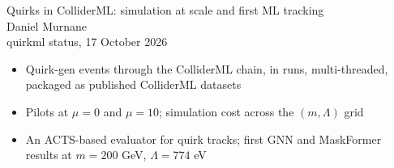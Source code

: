 \documentclass[aspectratio=169,10pt]{beamer}
\begin{document}
\begin{frame}
\vspace{2em}
{\Large Quirks in ColliderML: simulation at scale and first ML tracking}\\[1em]
Daniel Murnane\\[0.3em]
{\small quirkml status, 17 October 2026}\\[2em]
\small
\begin{itemize}
\item Quirk-gen events through the ColliderML chain, in runs, multi-threaded, packaged as published ColliderML datasets
\item Pilots at $\mu = 0$ and $\mu = 10$; simulation cost across the $(m, \Lambda)$ grid
\item An ACTS-based evaluator for quirk tracks; first GNN and MaskFormer results at $m = 200$ GeV, $\Lambda = 774$ eV
\end{itemize}
\end{frame}
\end{document}
